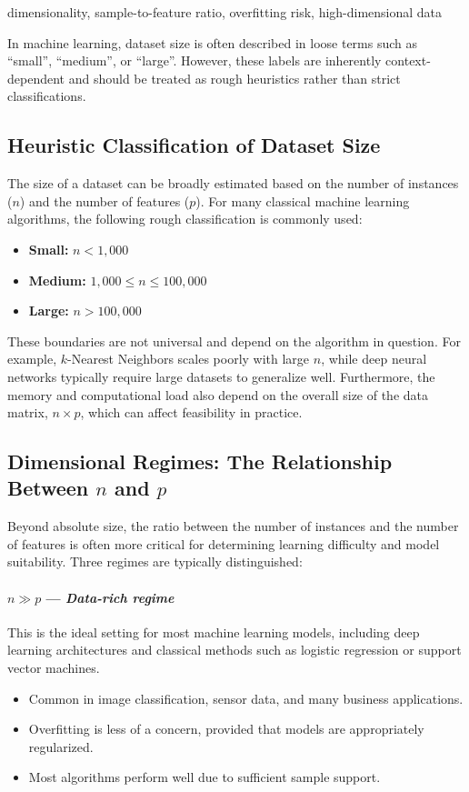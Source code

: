 \documentclass[12pt,openany]{book}
\begin{document}
\begin{keywordsbox}
dimensionality, sample-to-feature ratio, overfitting risk, high-dimensional data
\end{keywordsbox}


In machine learning, dataset size is often described in loose terms such as ``small'', ``medium'', or ``large''. However, these labels are inherently context-dependent and should be treated as rough heuristics rather than strict classifications.

\subsection{Heuristic Classification of Dataset Size}

The size of a dataset can be broadly estimated based on the number of instances (\(n\)) and the number of features (\(p\)). For many classical machine learning algorithms, the following rough classification is commonly used:

\begin{itemize}
    \item \textbf{Small:} \(n < 1{,}000\)
    \item \textbf{Medium:} \(1{,}000 \leq n \leq 100{,}000\)
    \item \textbf{Large:} \(n > 100{,}000\)
\end{itemize}

These boundaries are not universal and depend on the algorithm in question. For example, \(k\)-Nearest Neighbors scales poorly with large \(n\), while deep neural networks typically require large datasets to generalize well. Furthermore, the memory and computational load also depend on the overall size of the data matrix, \(n \times p\), which can affect feasibility in practice.

\subsection{Dimensional Regimes: The Relationship Between \(n\) and \(p\)}

Beyond absolute size, the ratio between the number of instances and the number of features is often more critical for determining learning difficulty and model suitability. Three regimes are typically distinguished:

\paragraph{\(n \gg p\) --- \textit{Data-rich regime}}
This is the ideal setting for most machine learning models, including deep learning architectures and classical methods such as logistic regression or support vector machines.
\begin{itemize}
    \item Common in image classification, sensor data, and many business applications.
    \item Overfitting is less of a concern, provided that models are appropriately regularized.
    \item Most algorithms perform well due to sufficient sample support.
\end{itemize}
\end{document}
